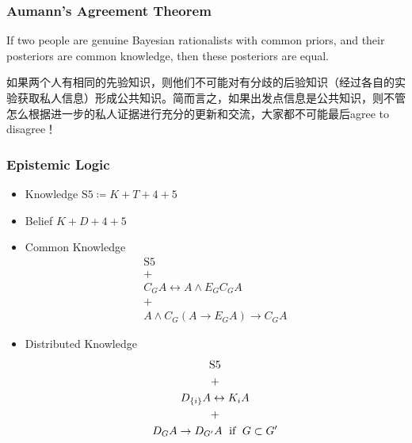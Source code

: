\documentclass[UTF8,aspectratio=43,11pt,colorlinks,compress,openany]{beamer}%
\begin{document}
\begin{frame}\frametitle{Aumann's Agreement Theorem}
\begin{theorem}
If two people are genuine Bayesian rationalists with common priors, and their posteriors are common knowledge, then these posteriors are equal.
\end{theorem}
如果两个人有相同的先验知识，则他们不可能对有分歧的后验知识（经过各自的实验获取私人信息）形成公共知识。简而言之，如果出发点信息是公共知识，则不管怎么根据进一步的私人证据进行充分的更新和交流，大家都不可能最后agree to disagree！
\end{frame}

\begin{frame}\frametitle{Epistemic Logic}
\setlength\abovedisplayskip{0pt}
\setlength\belowdisplayskip{0pt}
\begin{itemize}
	\item Knowledge $\mathrm{S5}\coloneqq K+T+4+5$\\
	\begin{center}
	\end{center}
	\item Belief $K+D+4+5$
	\item Common Knowledge\vspace{-2ex}
	\begin{gather*}
	\mathrm{S5}\\
	+\\
	C_G A\leftrightarrow A\wedge E_GC_G A\\
	+\\
	A\wedge C_G(A\to E_G A)\to C_G A
	\end{gather*}
	\item Distributed Knowledge\vspace{-1ex}
	\begin{gather*}
	\mathrm{S5}\\
	+\\
	D_{\{i\}}A\leftrightarrow K_i A\\
	+\\
	D_G A\to D_{G'} A \mbox{\; if \;} G\subset G'
	\end{gather*}
\end{itemize}
\end{frame}
\end{document}
